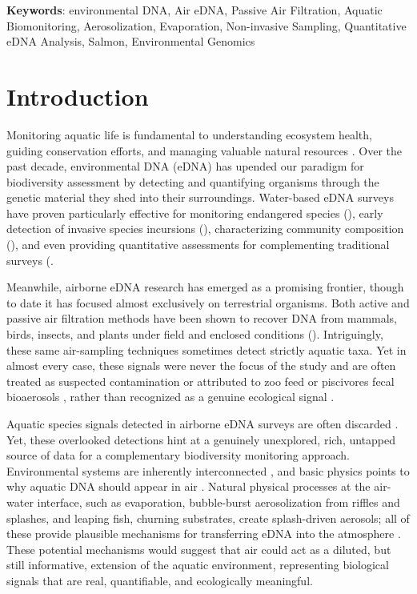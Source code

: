 \documentclass{article}
\begin{document}
\textbf{Keywords}: environmental DNA, Air eDNA, Passive Air Filtration, Aquatic Biomonitoring, Aerosolization, Evaporation, Non-invasive Sampling, Quantitative eDNA Analysis, Salmon, Environmental Genomics

\section{Introduction}
Monitoring aquatic life is fundamental to understanding ecosystem health, guiding conservation efforts, and managing valuable natural resources \cite{dudgeon2006,reid2019}. Over the past decade, environmental DNA (eDNA) has upended our paradigm for biodiversity assessment by detecting and quantifying organisms through the genetic material they shed into their surroundings. Water-based eDNA surveys have proven particularly effective for monitoring endangered species (\cite{biggs2015}), early detection of invasive species incursions (\cite{thomas2020}), characterizing community composition (\cite{wilkinson2024}), and even providing quantitative assessments for complementing traditional surveys (\cite{allan2023,guri2024a,tillotson2018}. 

Meanwhile, airborne eDNA research has emerged as a promising frontier, though to date it has focused almost exclusively on terrestrial organisms. Both active and passive air filtration methods have been shown to recover DNA from mammals, birds, insects, and plants under field and enclosed conditions (\cite{clare2021, garrett2023, johnson2019, johnson2023, lynggaard2024, roger2022, lynggaard2022}). Intriguingly, these same air-sampling techniques sometimes detect strictly aquatic taxa. Yet in almost every case, these signals were never the focus of the study and are often treated as suspected contamination or attributed to zoo feed or piscivores fecal bioaerosols \cite{sullivan2023, klepke2022, lynggaard2023, lynggaard2022}, rather than recognized as a genuine ecological signal \cite{tournayre2025}.

Aquatic species signals  detected in airborne eDNA surveys are often discarded \cite{altermatt2025, klepke2022, johnson2024, lynggaard2023}. Yet, these overlooked detections hint at a genuinely unexplored, rich, untapped source of data for a complementary biodiversity monitoring approach. Environmental systems are inherently interconnected \cite{folke2021}, and basic physics points to why aquatic DNA should appear in air \cite{monahan1986, seinfeld2016}. Natural physical processes at the air-water interface, such as evaporation, bubble-burst aerosolization from riffles and splashes, and leaping fish, churning substrates, create splash-driven aerosols; all of these provide plausible mechanisms for transferring eDNA into the atmosphere \cite{duchemin2002, mueller2008, stell2020, vandijk2003}. These potential mechanisms would suggest that air could act as a diluted, but still informative, extension of the aquatic environment, representing biological signals that are real, quantifiable, and ecologically meaningful.
\end{document}
